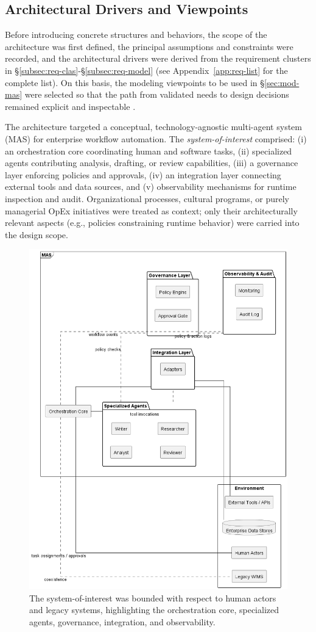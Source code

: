 \subsection{Architectural Drivers and Viewpoints}\label{subsec\:arch-drivers}
Before introducing concrete structures and behaviors, the scope of the architecture was first defined, the principal assumptions and constraints were recorded, and the architectural drivers were derived from the requirement clusters in §\ref{subsec:req-clas}-§\ref{subsec:req-model} (see Appendix~\ref{app:req-list} for the complete list). On this basis, the modeling viewpoints to be used in §\ref{sec:mod-mas} were selected so that the path from validated needs to design decisions remained explicit and inspectable \parencite{peffersDesign2007}.

The architecture targeted a conceptual, technology-agnostic multi-agent system (MAS) for enterprise workflow automation. The \emph{system-of-interest} comprised: (i) an orchestration core coordinating human and software tasks, (ii) specialized agents contributing analysis, drafting, or review capabilities, (iii) a governance layer enforcing policies and approvals, (iv) an integration layer connecting external tools and data sources, and (v) observability mechanisms for runtime inspection and audit. Organizational processes, cultural programs, or purely managerial OpEx initiatives were treated as context; only their architecturally relevant aspects (e.g., policies constraining runtime behavior) were carried into the design scope.

\begin{figure}[t]
  \centering
  \includegraphics[width=0.5\linewidth]{ressources/MAS/figures/5_1a_scope_boundary.png}
  \caption{The system-of-interest was bounded with respect to human actors and legacy systems, highlighting the orchestration core, specialized agents, governance, integration, and observability.}
  \label{fig:5.1a-scope-boundary}
\end{figure}

